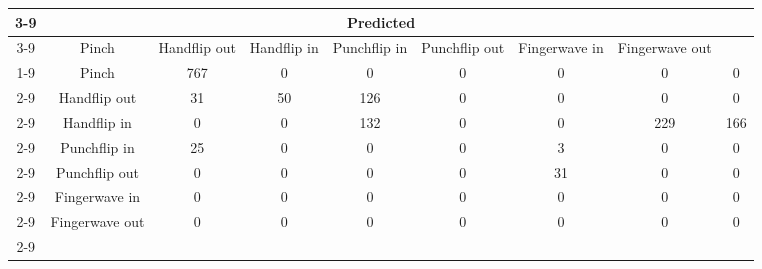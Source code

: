 \documentclass{standalone}
\begin{document}
 
 \begin{tabular}{|c |c |c |c |c |c |c |c |c |}
\cline{3-9}\multicolumn{2}{c|}{} & \multicolumn{7}{c|}{Predicted} \\ 
\cline{3-9} \multicolumn{2}{c |}{ } & Pinch & Handflip out & Handflip in & Punchflip in & Punchflip out & Fingerwave in & Fingerwave out\\ 
\cline{1-9}\multirow{7}{*}{\rotatebox[origin=c]{90}{Actual}} & Pinch & 767 & 0 & 0 & 0 & 0 & 0 & 0\\ 
 \cline{2-9} & Handflip out & 31 & 50 & 126 & 0 & 0 & 0 & 0\\ 
 \cline{2-9} & Handflip in & 0 & 0 & 132 & 0 & 0 & 229 & 166\\ 
 \cline{2-9} & Punchflip in & 25 & 0 & 0 & 0 & 3 & 0 & 0\\ 
 \cline{2-9} & Punchflip out & 0 & 0 & 0 & 0 & 31 & 0 & 0\\ 
 \cline{2-9} & Fingerwave in & 0 & 0 & 0 & 0 & 0 & 0 & 0\\ 
 \cline{2-9} & Fingerwave out & 0 & 0 & 0 & 0 & 0 & 0 & 0\\ 
 \cline{2-9}\hline \end{tabular}
 
\end{document}
